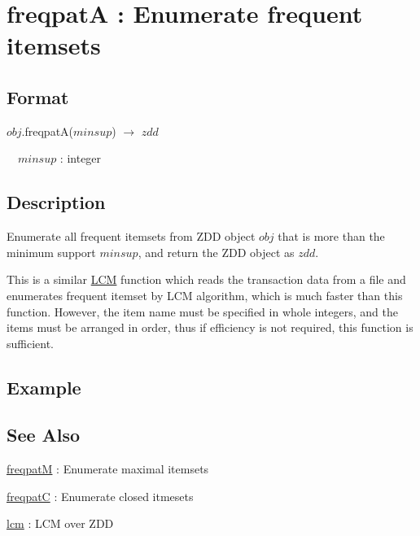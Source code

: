 
\section{freqpatA : Enumerate frequent itemsets\label{sect:freqpatA}}
\subsection*{Format}
$obj$.freqpatA($minsup$) $\rightarrow$ $zdd$

~~$minsup$ : integer

\subsection*{Description}
Enumerate all frequent itemsets from ZDD object $obj$ that is more than the minimum support $minsup$, and return the ZDD object as $zdd$. 

This is a similar \hyperref[sect:lcm]{LCM} function which reads the transaction data from a file and enumerates frequent itemset by LCM algorithm, which is much faster than this function. 
However,  the item name must be specified in whole integers, and the items must be arranged in order, thus if efficiency is not required, this function is sufficient. 


\subsection*{Example}


\subsection*{See Also}
\hyperref[sect:freqpatM]{freqpatM} : Enumerate maximal itemsets 

\hyperref[sect:freqpatC]{freqpatC} : Enumerate closed itmesets

\hyperref[sect:lcm]{lcm} : LCM over ZDD

